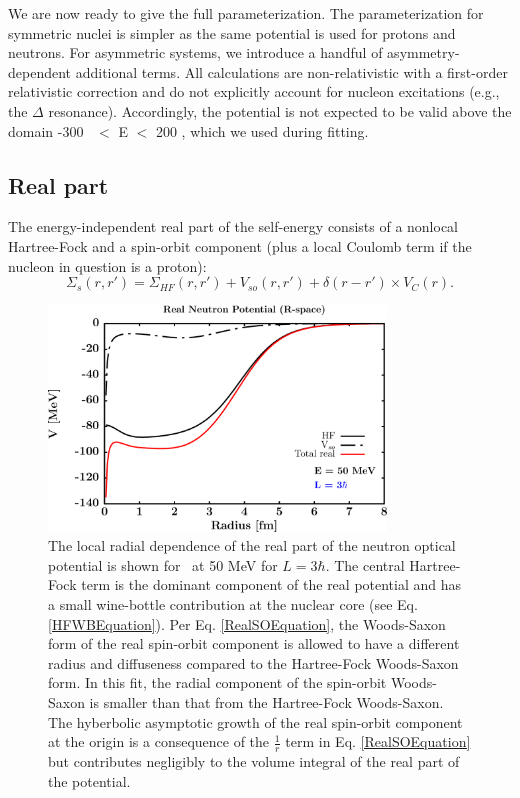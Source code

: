 We are now ready to give the full parameterization. The parameterization for symmetric nuclei
is simpler as the same potential is used for protons and neutrons. For asymmetric systems, we
introduce a handful of asymmetry-dependent additional terms.
All calculations are non-relativistic
with a first-order relativistic correction and do not explicitly account for
nucleon excitations (e.g., the $\Delta$ resonance). Accordingly, the potential
is not expected to be valid above
the domain -300 \mega\electronvolt\ $<$ E $<$ 200 \mega\electronvolt,
which we used during fitting.

\subsection{Real part}
The energy-independent real part of the self-energy consists of a nonlocal Hartree-Fock and
a spin-orbit component (plus a local Coulomb term if the nucleon in question is a proton):
\begin{equation}
    \Sigma_{s}(r,r') =
    \Sigma_{HF}(r,r')+V_{so}(r,r')+\delta(r-r')\times V_{C}(r).
\end{equation}
\begin{figure}[tb]
    \centering
    \includegraphics[width=0.8\textwidth]{figures/RealPotentialRSpace.png}
    \caption[Radial dependence of the real part of the potential]
    {
        The local radial dependence of the real part of the neutron optical potential is shown
        for \caForty\ at 50 MeV for $L=3\hbar$. The central Hartree-Fock term
        is the dominant component of the real potential and has a small
        wine-bottle contribution at the nuclear core (see Eq.
        \ref{HFWBEquation}). Per Eq. \ref{RealSOEquation}, the Woods-Saxon form
        of the real spin-orbit component is allowed to have a different radius
        and diffuseness compared to the Hartree-Fock Woods-Saxon form. In this
        fit, the radial component of the spin-orbit Woods-Saxon is smaller than
        that from the Hartree-Fock Woods-Saxon. The
        hyberbolic asymptotic growth of the real spin-orbit component at the
        origin is a consequence of the $\frac{1}{r}$ term in Eq. \ref{RealSOEquation}
        but contributes negligibly to the volume integral of the real part of the potential.
    }
    \label{RealRadialDependence}
\end{figure}
